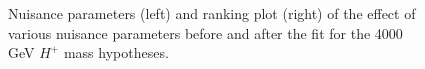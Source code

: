 \begin{figure}[H]
  \centering
  \caption{Nuisance parameters (left) and ranking plot (right) of the effect of various nuisance parameters before and after the fit for the 4000 GeV $H^{+}$ mass hypotheses.}
\end{figure}
